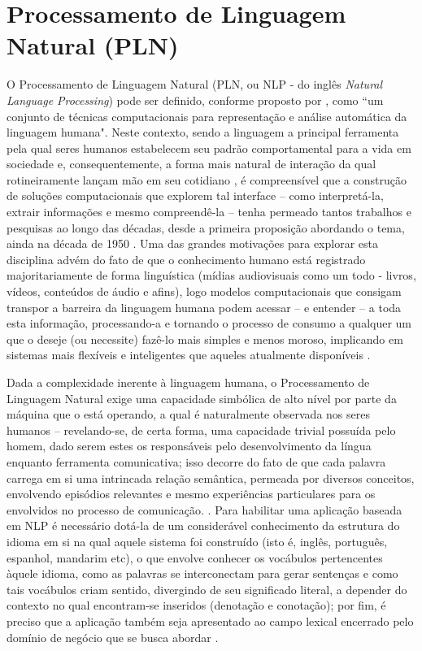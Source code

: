 \section{Processamento de Linguagem Natural (PLN)}
\label{sec:npl}

O Processamento de Linguagem Natural (PLN, ou NLP - do inglês \textit{Natural Language Processing}) pode ser definido, conforme proposto por , como ``um conjunto de técnicas computacionais para representação e análise automática da linguagem humana". Neste contexto, sendo a linguagem a principal ferramenta pela qual seres humanos estabelecem seu padrão comportamental para a vida em sociedade e, consequentemente, a forma mais natural de interação da qual rotineiramente lançam mão em seu cotidiano \cite{allen1988natural}, é compreensível que a construção de soluções computacionais que explorem tal interface -- como interpretá-la, extrair informações e mesmo compreendê-la -- tenha permeado tantos trabalhos e pesquisas ao longo das décadas, desde a primeira proposição abordando o tema, ainda na década de 1950 \cite{cambria2014jumping}. Uma das grandes motivações para explorar esta disciplina advém do fato de que o conhecimento humano está registrado majoritariamente de forma linguística (mídias audiovisuais como um todo - livros, vídeos, conteúdos de áudio e afins), logo modelos computacionais que consigam transpor a barreira da linguagem humana podem acessar -- e entender -- a toda esta informação, processando-a e tornando o processo de consumo a qualquer um que o deseje (ou necessite) fazê-lo mais simples e menos moroso, implicando em sistemas mais flexíveis e inteligentes que aqueles atualmente disponíveis \cite{allen1988natural}.

Dada a complexidade inerente à linguagem humana, o Processamento de Linguagem Natural exige uma capacidade simbólica de alto nível por parte da máquina que o está operando, a qual é naturalmente observada nos seres humanos -- revelando-se, de certa forma, uma capacidade trivial possuída pelo homem, dado serem estes os responsáveis pelo desenvolvimento da língua enquanto ferramenta comunicativa; isso decorre do fato de que cada palavra carrega em si uma intrincada relação semântica, permeada por diversos conceitos, envolvendo episódios relevantes e mesmo experiências particulares para os envolvidos no processo de comunicação. \cite{cambria2014jumping}. Para habilitar uma aplicação baseada em NLP é necessário dotá-la de um considerável conhecimento da estrutura do idioma em si na qual aquele sistema foi construído (isto é, inglês, português, espanhol, mandarim etc), o que envolve conhecer os vocábulos pertencentes àquele idioma, como as palavras se interconectam para gerar sentenças e como tais vocábulos criam sentido, divergindo de seu significado literal, a depender do contexto no qual encontram-se inseridos (denotação e conotação); por fim, é preciso que a aplicação também seja apresentado ao campo lexical encerrado pelo domínio de negócio que se busca abordar \cite{allen1988natural}.

